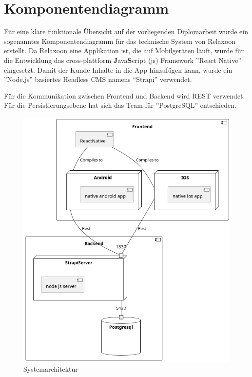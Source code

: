 \section{Komponentendiagramm}

Für eine klare funktionale Übersicht auf der vorliegenden Diplomarbeit
wurde ein sogenanntes Komponentendiagramm für das technische System von Relaxoon erstellt.
Da Relaxoon eine Applikation ist, die auf Mobilgeräten läuft,
wurde für die Entwicklung das cross-plattform \textbf{J}ava\textbf{S}cript  (js)
Framework ''React Native'' eingesetzt. Damit der Kunde Inhalte in die App hinzufügen kann,
wurde ein ''Node.js'' basiertes Headless CMS
namens “Strapi” verwendet.

Für die Kommunikation zwischen Frontend und Backend wird REST verwendet.
Für die Persistierungsebene hat sich das Team für ''PostgreSQL'' entschieden.


\begin{figure}[H]
    \centering
    \includegraphics[width=\textwidth]{./pics/system-architektur.png}
    \caption{Systemarchitektur}
    \label{fig:Systemarchitektur}
\end{figure}